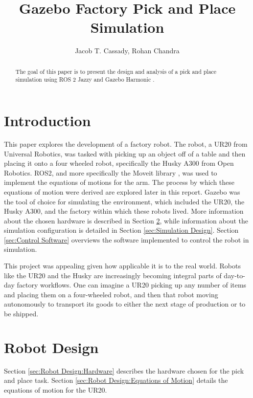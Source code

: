 \documentclass[journal]{new-aiaa}
\title{Gazebo Factory Pick and Place Simulation}
\author{Jacob T. Cassady, Rohan Chandra}
\affil{Johns Hopkins University, Whiting School of Engineering, Baltimore, MD, 21206}
\begin{document}
\maketitle
\begin{abstract}
    The goal of this paper is to present the design and analysis of a pick and place simulation using ROS 2 Jazzy \cite{doi:10.1126/scirobotics.abm6074} and Gazebo Harmonic \cite{Gazebo}.
\end{abstract}

\section{Introduction}\label{sec:Introduction}
This paper explores the development of a factory robot. 
The robot, a UR20 from Universal Robotics, was tasked with picking up an object off of a table and then placing it onto a four wheeled robot, specifically the Husky A300 from Open Robotics. 
ROS2, and more specifically the Moveit library \cite{DBLP:journals/corr/ColemanSCC14}, was used to implement the equations of motions for the arm. 
The process by which these equations of motion were derived are explored later in this report. 
Gazebo was the tool of choice for simulating the environment, which included the UR20, the Husky A300, and the factory within which these robots lived. 
More information about the chosen hardware is described in Section \ref{sec:Robot Design}, while information about the simulation configuration is detailed in Section \ref{sec:Simulation Design}.
Section \ref{sec:Control Software} overviews the software implemented to control the robot in simulation.

This project was appealing given how applicable it is to the real world. 
Robots like the UR20 and the Husky are increasingly becoming integral parts of day-to-day factory workflows. 
One can imagine a UR20 picking up any number of items and placing them on a four-wheeled robot, and then that robot moving autonomously to transport its goods to either the next stage of production or to be shipped.

\section{Robot Design}\label{sec:Robot Design}

Section \ref{sec:Robot Design:Hardware} describes the hardware chosen for the pick and place task.
Section \ref{sec:Robot Design:Equations of Motion} details the equations of motion for the UR20.
\end{document}
